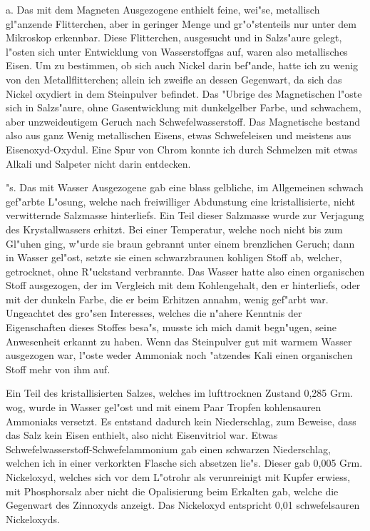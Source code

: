 \documentclass[a4paper, 11pt, oneside]{article}
\begin{document}
a. Das mit dem Magneten Ausgezogene enthielt feine, wei"se, metallisch gl"anzende Flitterchen, aber in geringer Menge und gr"o"stenteils nur unter dem Mikroskop erkennbar. Diese Flitterchen, ausgesucht und in Salzs"aure gelegt, l"osten sich unter Entwicklung von Wasserstoffgas auf, waren also metallisches Eisen. Um zu bestimmen, ob sich auch Nickel darin bef"ande, hatte ich zu wenig von den Metallflitterchen; allein ich zweifle an dessen Gegenwart, da sich das Nickel oxydiert in dem Steinpulver befindet. Das "Ubrige des Magnetischen l"oste sich in Salzs"aure, ohne Gasentwicklung mit dunkelgelber Farbe, und schwachem, aber unzweideutigem Geruch nach Schwefelwasserstoff. Das Magnetische bestand also aus ganz Wenig metallischen Eisens, etwas Schwefeleisen und meistens aus Eisenoxyd-Oxydul. Eine Spur von Chrom konnte ich durch Schmelzen mit etwas Alkali und Salpeter nicht darin entdecken.

"s. Das mit Wasser Ausgezogene gab eine blass gelbliche, im Allgemeinen schwach gef"arbte L"osung, welche nach freiwilliger Abdunstung eine kristallisierte, nicht verwitternde Salzmasse hinterliefs. Ein Teil dieser Salzmasse wurde zur Verjagung des Krystallwassers erhitzt. Bei einer Temperatur, welche noch nicht bis zum Gl"uhen ging, w"urde sie braun gebrannt unter einem brenzlichen Geruch; dann in Wasser gel"ost, setzte sie einen schwarzbraunen kohligen Stoff ab, welcher, getrocknet, ohne R"uckstand verbrannte. Das Wasser hatte also einen organischen Stoff ausgezogen, der im Vergleich mit dem Kohlengehalt, den er hinterliefs, oder mit der dunkeln Farbe, die er beim Erhitzen annahm, wenig gef"arbt war. Ungeachtet des gro"sen Interesses, welches die n"ahere Kenntnis der Eigenschaften dieses Stoffes besa"s, musste ich mich damit begn"ugen, seine Anwesenheit erkannt zu haben. Wenn das Steinpulver gut mit warmem Wasser ausgezogen war, l"oste weder Ammoniak noch "atzendes Kali einen organischen Stoff mehr von ihm auf.

Ein Teil des kristallisierten Salzes, welches im lufttrocknen Zustand 0,285 Grm. wog, wurde in Wasser gel"ost und mit einem Paar Tropfen kohlensauren Ammoniaks versetzt. Es entstand dadurch kein Niederschlag, zum Beweise, dass das Salz kein Eisen enthielt, also nicht Eisenvitriol war. Etwas Schwefelwasserstoff-Schwefelammonium gab einen schwarzen Niederschlag, welchen ich in einer verkorkten Flasche sich absetzen lie"s. Dieser gab 0,005 Grm. Nickeloxyd, welches sich vor dem L"otrohr als verunreinigt mit Kupfer erwiess, mit Phosphorsalz aber nicht die Opalisierung beim Erkalten gab, welche die Gegenwart des Zinnoxyds anzeigt. Das Nickeloxyd entspricht 0,01 schwefelsauren Nickeloxyds.
\end{document}
